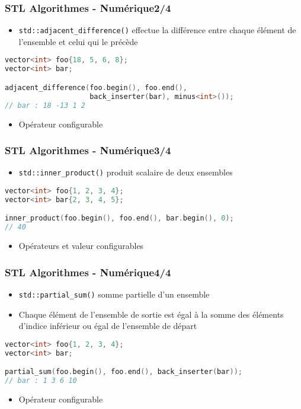 \documentclass[C++.tex]{subfiles}
\begin{document}
\begin{frame}[fragile]
	\frametitle{STL Algorithmes - Numérique\titlehfill{}2/4}
	\begin{itemize}
		\item \lstinline|std::adjacent_difference()| effectue la \og différence\fg{} entre chaque élément de l'ensemble et celui qui le précède
	\end{itemize}

	\begin{lstlisting}[language=C++]
vector<int> foo{18, 5, 6, 8};
vector<int> bar;

adjacent_difference(foo.begin(), foo.end(), 
                    back_inserter(bar), minus<int>());
// bar : 18 -13 1 2\end{lstlisting}

	\begin{itemize}
		\item Opérateur configurable
	\end{itemize}
\end{frame}

\begin{frame}[fragile]
	\frametitle{STL Algorithmes - Numérique\titlehfill{}3/4}
	\begin{itemize}
		\item \lstinline|std::inner_product()| \og produit scalaire\fg{} de deux ensembles
	\end{itemize}

	\begin{lstlisting}[language=C++]
vector<int> foo{1, 2, 3, 4};
vector<int> bar{2, 3, 4, 5};

inner_product(foo.begin(), foo.end(), bar.begin(), 0);
// 40\end{lstlisting}

	\begin{itemize}
		\item Opérateurs et valeur configurables
	\end{itemize}
\end{frame}

\begin{frame}[fragile]
	\frametitle{STL Algorithmes - Numérique\titlehfill{}4/4}
	\begin{itemize}
		\item \lstinline|std::partial_sum()| \og somme\fg{} partielle d'un ensemble
		\item Chaque élément de l'ensemble de sortie est égal à la somme des éléments d'indice inférieur ou égal de l'ensemble de départ
	\end{itemize}

	\begin{lstlisting}[language=C++]
vector<int> foo{1, 2, 3, 4};
vector<int> bar;

partial_sum(foo.begin(), foo.end(), back_inserter(bar));
// bar : 1 3 6 10\end{lstlisting}

	\begin{itemize}
		\item Opérateur configurable
	\end{itemize}
\end{frame}
\end{document}
